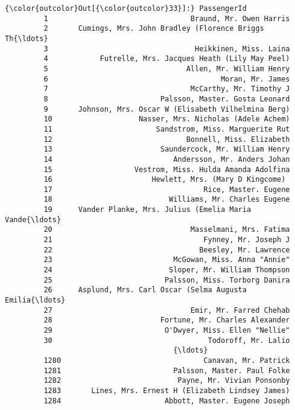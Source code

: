 \documentclass[11pt]{article}
\begin{document}
\begin{Verbatim}[commandchars=\\\{\}]
{\color{outcolor}Out[{\color{outcolor}33}]:} PassengerId
         1                                 Braund, Mr. Owen Harris
         2       Cumings, Mrs. John Bradley (Florence Briggs Th{\ldots}
         3                                  Heikkinen, Miss. Laina
         4            Futrelle, Mrs. Jacques Heath (Lily May Peel)
         5                                Allen, Mr. William Henry
         6                                        Moran, Mr. James
         7                                 McCarthy, Mr. Timothy J
         8                          Palsson, Master. Gosta Leonard
         9       Johnson, Mrs. Oscar W (Elisabeth Vilhelmina Berg)
         10                    Nasser, Mrs. Nicholas (Adele Achem)
         11                        Sandstrom, Miss. Marguerite Rut
         12                               Bonnell, Miss. Elizabeth
         13                         Saundercock, Mr. William Henry
         14                            Andersson, Mr. Anders Johan
         15                   Vestrom, Miss. Hulda Amanda Adolfina
         16                       Hewlett, Mrs. (Mary D Kingcome) 
         17                                   Rice, Master. Eugene
         18                           Williams, Mr. Charles Eugene
         19      Vander Planke, Mrs. Julius (Emelia Maria Vande{\ldots}
         20                                Masselmani, Mrs. Fatima
         21                                   Fynney, Mr. Joseph J
         22                                  Beesley, Mr. Lawrence
         23                            McGowan, Miss. Anna "Annie"
         24                           Sloper, Mr. William Thompson
         25                          Palsson, Miss. Torborg Danira
         26      Asplund, Mrs. Carl Oscar (Selma Augusta Emilia{\ldots}
         27                                Emir, Mr. Farred Chehab
         28                         Fortune, Mr. Charles Alexander
         29                          O'Dwyer, Miss. Ellen "Nellie"
         30                                    Todoroff, Mr. Lalio
                                       {\ldots}                        
         1280                                 Canavan, Mr. Patrick
         1281                          Palsson, Master. Paul Folke
         1282                           Payne, Mr. Vivian Ponsonby
         1283       Lines, Mrs. Ernest H (Elizabeth Lindsey James)
         1284                        Abbott, Master. Eugene Joseph

\end{Verbatim}
\end{document}
